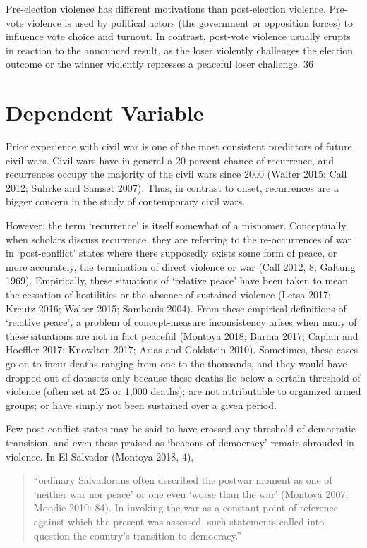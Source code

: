 \documentclass [11pt]{article}
\begin{document}
Pre-election violence has different motivations than post-election
violence. Pre-vote violence is used by political actors (the government or opposition
forces) to influence vote choice and turnout. In contrast, post-vote violence
usually erupts in reaction to the announced result, as the loser violently challenges
the election outcome or the winner violently represses a peaceful loser
challenge. 36


\section*{Dependent Variable}

Prior experience with civil war is one of the most consistent predictors of future civil wars. Civil wars have in general a 20 percent chance of recurrence, and recurrences occupy the majority of the civil wars since 2000 (Walter 2015; Call 2012; Suhrke and Samset 2007). Thus, in contrast to onset, recurrences are a bigger concern in the study of contemporary civil wars.

However, the term ‘recurrence’ is itself somewhat of a misnomer. Conceptually, when scholars discuss recurrence, they are referring to the re-occurrences of war in ‘post-conflict’ states where there supposedly exists some form of peace, or more accurately, the termination of direct violence or war (Call 2012, 8; Galtung 1969). Empirically, these situations of ‘relative peace’ have been taken to mean the cessation of hostilities or the absence of sustained violence (Letsa 2017; Kreutz 2016; Walter 2015; Sambanis 2004). From these empirical definitions of ‘relative peace’, a problem of concept-measure inconsistency arises when many of these situations are not in fact peaceful (Montoya 2018; Barma 2017; Caplan and Hoeffler 2017; Knowlton 2017; Arias and Goldstein 2010). Sometimes, these cases go on to incur deaths ranging from one to the thousands, and they would have dropped out of datasets only because these deaths lie below a certain threshold of violence (often set at 25 or 1,000 deaths); are not attributable to organized armed groups; or have simply not been sustained over a given period.

Few post-conflict states may be said to have crossed any threshold of democratic transition, and even those praised as `beacons of democracy' remain shrouded in violence. In El Salvador (Montoya 2018, 4), 

\begin{quote}
\small
``ordinary Salvadorans often described the postwar moment as one of ‘neither war nor peace’ or one even ‘worse than the war’ (Montoya 2007; Moodie 2010: 84). In invoking the war as a constant point of reference against which the present was assessed, such statements called into question the country’s transition to democracy.''
\end{quote}
\end{document}
